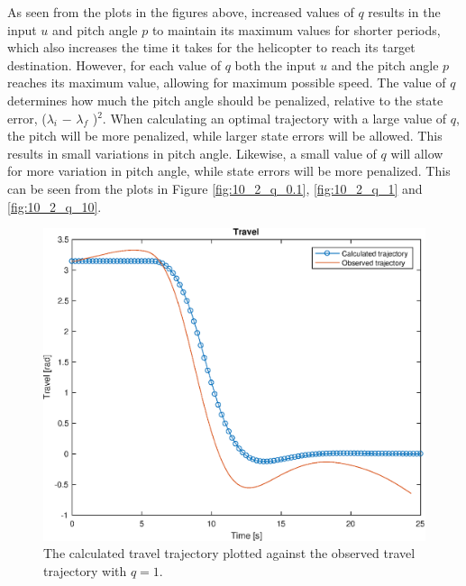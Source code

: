 As seen from the plots in the figures above, increased values of $q$ results in the input $u$ and pitch angle $p$ to maintain its maximum values for shorter periods, which also increases the time it takes for the helicopter to reach its target destination. However, for each value of $q$ both the input $u$ and the pitch angle $p$ reaches its maximum value, allowing for maximum possible speed. The value of $q$ determines how much the pitch angle should be penalized, relative to the state error, ($\lambda_i$ $-$ $\lambda_f$ )$^2$. When calculating an optimal trajectory with a large value of $q$, the pitch will be more penalized, while larger state errors will be allowed. This results in small variations in pitch angle. Likewise, a small value of $q$ will allow for more variation in pitch angle, while state errors will be more penalized. This can be seen from the plots in Figure \ref{fig:10_2_q_0.1}, \ref{fig:10_2_q_1} and \ref{fig:10_2_q_10}.\\

\begin{figure}[H]
\captionsetup{justification=centering}
\includegraphics[scale=0.56]{data_10.2/Calculated_vs_Observed_Travel_q_1.eps} 
\centering
\caption{The calculated travel trajectory plotted against the observed travel trajectory with $q = 1$.}  \label{fig:travel_opt}
\end{figure}

